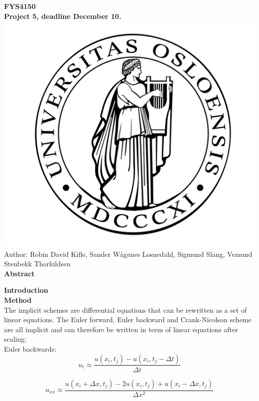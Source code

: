 \documentclass[10pt,a4paper]{article}
\begin{document}
\begin{center}

{\LARGE\bf
FYS4150\\
\vspace{0.5cm}
Project 5, deadline December 10.
}
 \includegraphics[scale=0.075]{figures/uio.png}\\
Author: Robin David Kifle, Sander Wågønes Losnedahl, Sigmund Slang, Vemund Stenbekk Thorkildsen\\
\vspace{1cm}
{\LARGE\bf
Abstract
}\\
\end{center}


\newpage
{\LARGE\bf
Introduction
}\\



\newpage
{\LARGE\bf
Method
}\\

\noindent The implicit schemes are differential equations that can be rewritten as a set of linear equations. The Euler forward, Euler backward and Crank-Nicolson scheme are all implicit and can therefore be written in term of linear equations after scaling:
\\
Euler backwards:
\\
$$
u_t \approx \frac{u(x_i,t_j) - u(x_i,t_j - \Delta t)}{\Delta t}
$$

$$
u_{xx} \approx \frac{u(x_i + \Delta x,t_j) - 2u(x_i,t_j) + u(x_i - \Delta x,t_j)}{\Delta x^2}
$$
\end{document}
